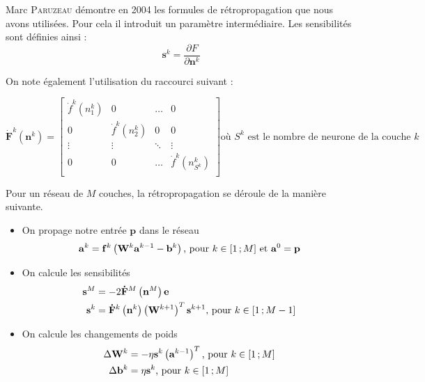 Marc \textsc{Paruzeau} démontre en 2004 les formules de rétropropagation que nous avons utilisées. Pour cela il introduit un paramètre %
intermédiaire. Les sensibilités sont définies ainsi :
\begin{equation}
 \mathbf{s}^k = \frac{\partial F}{\partial \mathbf{n}^k}
\end{equation}

On note également l'utilisation du raccourci suivant : 

\begin{equation}
  \displaystyle
 \mathbf{\dot F}^k\left(\mathbf{n}^k\right) =
 \begin{bmatrix}
  \dot f ^k\left(n^k_1\right) & 0 & \ldots & 0\\
  0 & \dot f^k\left(n^k_2\right) & 0 & 0\\
  \vdots & \vdots & \ddots & \vdots \\
  0 & 0 & \ldots & \dot f^k\left(n^k_{S^k}\right)\\
 \end{bmatrix}
 \text{où $S^k$ est le nombre de neurone de la couche $k$}
\end{equation}

Pour un réseau de $M$ couches, la rétropropagation se déroule de la manière suivante.
\begin{itemize}
 \item On propage notre entrée $\mathbf{p}$ dans le réseau
 \begin{equation}
   \mathbf{a}^k = \mathbf{f}^k\left(\mathbf{W}^k\mathbf{a}^{k-1} - \mathbf{b}^k\right) \text{, pour $k \in \mathopen{[}1\,;M\mathclose{]}$ et $\mathbf{a}^0 = \mathbf{p}$}
 \end{equation}
 
 \item On calcule les sensibilités 
 \begin{align}
  \mathbf{s}^M &= -2\mathbf{\dot F}^M\left(\mathbf{n}^M\right)\mathbf{e} \\
  \mathbf{s}^k &= \mathbf{\dot F}^k\left(\mathbf{n}^k\right)\left(\mathbf{W}^{k+1}\right)^T \mathbf{s}^{k+1} \text{, pour $k \in \mathopen{[}1\,;M-1\mathclose{]}$}
 \end{align}
 
 \item On calcule les changements de poids
 \begin{align}
  \Delta \mathbf{W}^k &= - \eta \mathbf{s}^k\left(\mathbf{a}^{k-1}\right)^T \text{, pour $k \in \mathopen{[}1\,;M\mathclose{]}$} \\
  \Delta \mathbf{b}^k &= \eta \mathbf{s}^k \text{, pour $k \in \mathopen{[}1\,;M\mathclose{]}$}
 \end{align}

\end{itemize}

